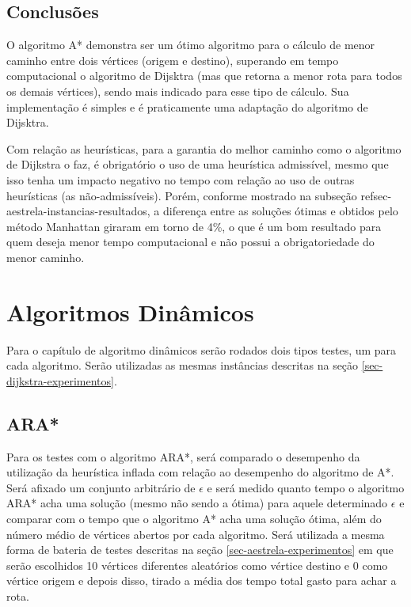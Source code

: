 \subsection{Conclusões}
\label{sec-aestrela-conclusao}
O algoritmo A* demonstra ser um ótimo algoritmo para o cálculo de menor caminho entre dois vértices (origem e destino), superando em tempo computacional o algoritmo de Dijsktra (mas que retorna a menor rota para todos os demais vértices), sendo mais indicado para esse tipo de cálculo. Sua implementação é simples e é praticamente uma adaptação do algoritmo de Dijsktra.

Com relação as heurísticas, para a garantia do melhor caminho como o algoritmo de Dijkstra o faz, é obrigatório o uso de uma heurística admissível, mesmo que isso tenha um impacto negativo no tempo com relação ao uso de outras heurísticas (as não-admissíveis). Porém, conforme mostrado na subseção ref{sec-aestrela-instancias-resultados}, a diferença entre as soluções ótimas e obtidos pelo método Manhattan giraram em torno de 4\%, o que é um bom resultado para quem deseja menor tempo computacional e não possui a obrigatoriedade do menor caminho.

\section{Algoritmos Dinâmicos}
\label{sec-experimentos-dinamicos}
Para o capítulo de algoritmo dinâmicos serão rodados dois tipos testes, um para cada algoritmo. Serão utilizadas as mesmas instâncias descritas na seção \ref{sec-dijkstra-experimentos}.

\subsection{ARA*}
\label{sec-experimentos-dinamicos-ara}

Para os testes com o algoritmo ARA*, será comparado o desempenho da utilização da heurística inflada com relação ao desempenho do algoritmo de A*. Será afixado um conjunto arbitrário de $\epsilon$ e será medido quanto tempo o algoritmo ARA* acha uma solução (mesmo não sendo a ótima) para aquele determinado $\epsilon$ e comparar com o tempo que o algoritmo A* acha uma solução ótima, além do número médio de vértices abertos por cada algoritmo. Será utilizada a mesma forma de bateria de testes descritas na seção \ref{sec-aestrela-experimentos} em que serão escolhidos 10 vértices diferentes aleatórios como vértice destino e 0 como vértice origem e depois disso, tirado a média dos tempo total gasto para achar a rota.

